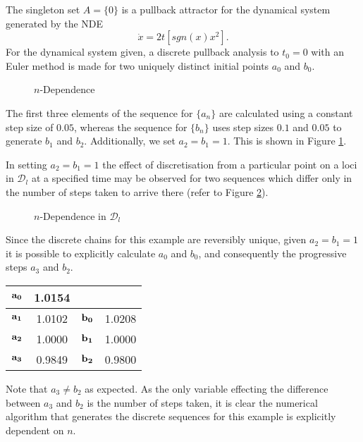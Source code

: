 \begin{eg}
The singleton set $A = \{ 0 \}$ is a pullback attractor for the dynamical system
generated by the NDE
\[ \dot{x} = 2 t \left[ sgn(x)x^2\right]. \]
For the dynamical system given, a discrete pullback analysis to $t_0 = 0$ with
an Euler method is made for two uniquely distinct initial points $a_0$ and
$b_0$.

\begin{figure}[h]
\begin{center}
 \caption{$n$-Dependence}
\protect\label{pdisc3}
\end{center}
\end{figure}

The first three elements of the sequence for $\{a_n\}$ are calculated using a
constant step size of $0.05$, whereas the sequence for $\{b_n \}$ uses step
sizes $0.1$ and $0.05$ to generate $b_1$ and $b_2$. Additionally, we set $a_2 =
b_1 = 1$. This is shown in Figure \ref{pdisc3}.

In setting $a_2 = b_1 = 1$ the effect of discretisation from a particular point
on a loci in $\mathcal{D}_l$ at a specified time may be observed for two
sequences which differ only in the number of steps taken to arrive there (refer
to Figure \ref{pdisc4}).

\begin{figure}[h]
\begin{center}
 \caption{$n$-Dependence in $\mathcal{D}_l$}
\protect\label{pdisc4}
\end{center}
\end{figure}

Since the discrete chains for this example are reversibly unique,
given $a_2 = b_1 = 1$ it is possible to explicitly calculate
$a_0$ and $b_0$, and consequently the progressive steps $a_3$ and $b_2$.

\begin{center}
\begin{tabular}{|c|c|c|c|}
\hline
${\bf a_0}$ & 1.0154 & &  \\ \hline
${\bf a_1}$ & 1.0102 & ${\bf b_0}$ & 1.0208 \\ \hline
${\bf a_2}$ & 1.0000 & ${\bf b_1}$ & 1.0000 \\ \hline
${\bf a_3}$ & 0.9849 & ${\bf b_2}$ & 0.9800 \\ \hline
\end{tabular}
\end{center}

Note that $a_3 \neq b_2$ as expected. As the only variable effecting the
difference between $a_3$ and $b_2$ is the number of steps taken, it is clear
the numerical algorithm that generates the discrete sequences for this example
is explicitly dependent on $n$.
\end{eg}

